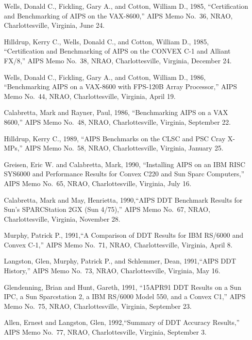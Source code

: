 \documentclass[twoside]{article}
\begin{document}
\begin{thebibliography}{9}


 Wells, Donald C., Fickling, Gary A., and Cotton,
   William D., 1985, ``Certification and Benchmarking of AIPS on the
   VAX-8600,'' AIPS Memo No.~36, NRAO, Charlottesville, Virginia,
   June 24.

 Hilldrup, Kerry C., Wells, Donald C., and Cotton,
   William D., 1985, ``Certification and Benchmarking of AIPS on the
   CONVEX C-1 and Alliant FX/8,'' AIPS Memo No.~38, NRAO,
   Charlottesville, Virginia, December 24.

 Wells, Donald C., Fickling, Gary A., and Cotton,
  William D., 1986, ``Benchmarking AIPS on a VAX-8600 with FPS-120B
   Array Processor,'' AIPS Memo No.~44, NRAO, Charlottesville,
   Virginia, April 19.

 Calabretta, Mark and Rayner, Paul, 1986,
   ``Benchmarking AIPS on a VAX 8600,'' AIPS Memo No.~48, NRAO,
   Charlottesville, Virginia, September 22.

 Hilldrup, Kerry C., 1989, ``AIPS Benchmarks on the
   CLSC and PSC Cray X-MPs,'' AIPS Memo No.~58, NRAO, Charlottesville,
   Virginia, January 25.

 Greisen, Eric W. and Calabretta, Mark, 1990,
   ``Installing AIPS on an IBM RISC SYS6000 and Performance Results
   for Convex C220 and Sun Sparc Computers,'' AIPS Memo No.~65, NRAO,
   Charlottesville, Virginia, July 16.

 Calabretta, Mark and May, Henrietta, 1990,``AIPS DDT
   Benchmark Results for Sun's SPARCStation 2GX (Sun 4/75),'' AIPS
   Memo No.~67, NRAO, Charlottesville, Virginia, November 28.

 Murphy, Patrick P., 1991,``A Comparison of DDT
   Results for IBM RS/6000 and Convex C-1,'' AIPS Memo No.~71, NRAO,
   Charlottesville, Virginia, April 8.

 Langston, Glen, Murphy, Patrick P., and Schlemmer,
   Dean, 1991,``AIPS DDT History,'' AIPS Memo No.~73, NRAO,
   Charlottesville, Virginia, May 16.

 Glendenning, Brian and Hunt, Gareth, 1991, ``15APR91
   DDT Results on a Sun IPC, a Sun Sparcstation 2, a IBM RS/6000 Model
   550, and a Convex C1,'' AIPS Memo No.~75, NRAO, Charlottesville,
   Virginia, September 23.

 Allen, Ernest and Langston, Glen, 1992,``Summary of
   DDT Accuracy Results,'' AIPS Memo No.~77, NRAO, Charlottesville,
   Virginia, September 3.


\end{thebibliography}
\end{document}
